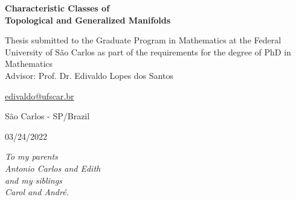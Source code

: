 \documentclass[12pt,oneside]{book}
\begin{document}
    \vspace{3cm}

    \begin{center}
        \Large{\textbf{Characteristic Classes of \\ Topological and Generalized Manifolds}}
    \end{center}

    \vspace{2cm}

    \begin{flushright}
        \begin{minipage}{0.55\textwidth}
            Thesis submitted to the Graduate Program in Mathematics at the Federal University of 
            São Carlos as part of the requirements for the degree of PhD in Mathematics \\[0.5cm] 
            Advisor: Prof. Dr. Edivaldo Lopes dos Santos

            \hspace{1.7cm}\scriptsize{\href{mailto:exemplo@dominio.com}{\textcolor{navyblue}{edivaldo@ufscar.br}}}
        \end{minipage}
    \end{flushright}

    \vfill

    \begin{center}
        São Carlos - SP/Brazil
    \end{center}

    \vspace{-0.8cm}

    \begin{center}
        03/24/2022
    \end{center}



    \newpage
    \thispagestyle{empty}

    \vspace{\fill}

    \begin{flushright}
        \begin{minipage}{5cm}
            \begin{flushright}
                \vspace{22cm}\textit{To my parents \\ Antonio Carlos and Edith \\ and my siblings \\ 
                Carol and André.}
            \end{flushright}
        \end{minipage}
    \end{flushright}
\end{document}

